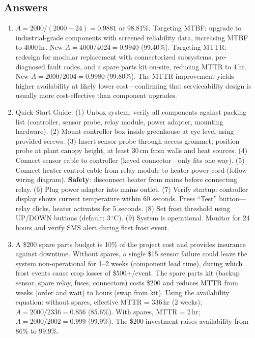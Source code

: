 \documentclass[11pt,letterpaper,twoside,openany]{book}
\newcommand{\degC}{\ensuremath{{}^{\circ}\text{C}}}
\begin{document}
\subsection{Answers}
\begin{enumerate}[leftmargin=1.5em]
\item $A = 2000/(2000+24) = 0.9881$ or 98.81\%. Targeting MTBF: upgrade to industrial-grade components with screened reliability data, increasing MTBF to 4000\,hr. New $A = 4000/4024 = 0.9940$ (99.40\%). Targeting MTTR: redesign for modular replacement with connectorized subsystems, pre-diagnosed fault codes, and a spare parts kit on-site, reducing MTTR to 4\,hr. New $A = 2000/2004 = 0.9980$ (99.80\%). The MTTR improvement yields higher availability at likely lower cost---confirming that serviceability design is usually more cost-effective than component upgrades.

\item Quick-Start Guide: (1) Unbox system; verify all components against packing list (controller, sensor probe, relay module, power adapter, mounting hardware). (2) Mount controller box inside greenhouse at eye level using provided screws. (3) Insert sensor probe through access grommet; position probe at plant canopy height, at least 30\,cm from walls and heat sources. (4) Connect sensor cable to controller (keyed connector---only fits one way). (5) Connect heater control cable from relay module to heater power cord (follow wiring diagram). \textbf{Safety}: disconnect heater from mains before connecting relay. (6) Plug power adapter into mains outlet. (7) Verify startup: controller display shows current temperature within 60 seconds. Press ``Test'' button---relay clicks, heater activates for 5 seconds. (8) Set frost threshold using UP/DOWN buttons (default: 3\,\degC). (9) System is operational. Monitor for 24 hours and verify SMS alert during first frost event.

\item A \$200 spare parts budget is 10\% of the project cost and provides insurance against downtime. Without spares, a single \$15 sensor failure could leave the system non-operational for 1--2 weeks (component lead time), during which frost events cause crop losses of \$500+/event. The spare parts kit (backup sensor, spare relay, fuses, connectors) costs \$200 and reduces MTTR from weeks (order and wait) to hours (swap from kit). Using the availability equation: without spares, effective MTTR = 336\,hr (2 weeks); $A = 2000/2336 = 0.856$ (85.6\%). With spares, MTTR = 2\,hr; $A = 2000/2002 = 0.999$ (99.9\%). The \$200 investment raises availability from 86\% to 99.9\%.


\end{enumerate}
\end{document}
